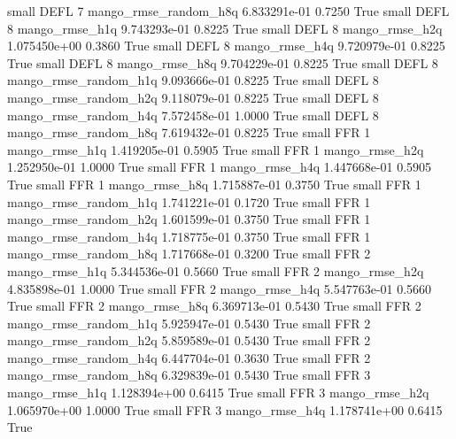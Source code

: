      small     DEFL                 7 mango_rmse_random_h8q 6.833291e-01      0.7250    True
     small     DEFL                 8        mango_rmse_h1q 9.743293e-01      0.8225    True
     small     DEFL                 8        mango_rmse_h2q 1.075450e+00      0.3860    True
     small     DEFL                 8        mango_rmse_h4q 9.720979e-01      0.8225    True
     small     DEFL                 8        mango_rmse_h8q 9.704229e-01      0.8225    True
     small     DEFL                 8 mango_rmse_random_h1q 9.093666e-01      0.8225    True
     small     DEFL                 8 mango_rmse_random_h2q 9.118079e-01      0.8225    True
     small     DEFL                 8 mango_rmse_random_h4q 7.572458e-01      1.0000    True
     small     DEFL                 8 mango_rmse_random_h8q 7.619432e-01      0.8225    True
     small      FFR                 1        mango_rmse_h1q 1.419205e-01      0.5905    True
     small      FFR                 1        mango_rmse_h2q 1.252950e-01      1.0000    True
     small      FFR                 1        mango_rmse_h4q 1.447668e-01      0.5905    True
     small      FFR                 1        mango_rmse_h8q 1.715887e-01      0.3750    True
     small      FFR                 1 mango_rmse_random_h1q 1.741221e-01      0.1720    True
     small      FFR                 1 mango_rmse_random_h2q 1.601599e-01      0.3750    True
     small      FFR                 1 mango_rmse_random_h4q 1.718775e-01      0.3750    True
     small      FFR                 1 mango_rmse_random_h8q 1.717668e-01      0.3200    True
     small      FFR                 2        mango_rmse_h1q 5.344536e-01      0.5660    True
     small      FFR                 2        mango_rmse_h2q 4.835898e-01      1.0000    True
     small      FFR                 2        mango_rmse_h4q 5.547763e-01      0.5660    True
     small      FFR                 2        mango_rmse_h8q 6.369713e-01      0.5430    True
     small      FFR                 2 mango_rmse_random_h1q 5.925947e-01      0.5430    True
     small      FFR                 2 mango_rmse_random_h2q 5.859589e-01      0.5430    True
     small      FFR                 2 mango_rmse_random_h4q 6.447704e-01      0.3630    True
     small      FFR                 2 mango_rmse_random_h8q 6.329839e-01      0.5430    True
     small      FFR                 3        mango_rmse_h1q 1.128394e+00      0.6415    True
     small      FFR                 3        mango_rmse_h2q 1.065970e+00      1.0000    True
     small      FFR                 3        mango_rmse_h4q 1.178741e+00      0.6415    True
